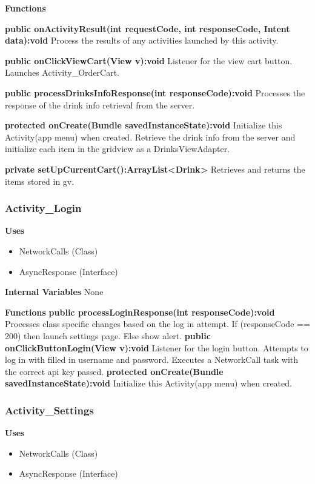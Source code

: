 \documentclass [10pt]{article}
\begin{document}
\textbf{Functions}

\textbf{public onActivityResult(int requestCode, int responseCode, Intent data):void}
Process the results of any activities launched by this activity.

\textbf{public onClickViewCart(View v):void}
Listener for the view cart button. Launches Activity\_OrderCart.

\textbf{public processDrinksInfoResponse(int responseCode):void}
Processes the response of the drink info retrieval from the server.

\textbf{protected onCreate(Bundle savedInstanceState):void}
Initialize this Activity(app menu) when created. Retrieve the drink info from the server and initialize each item in the gridview as a DrinksViewAdapter. 

\textbf{private setUpCurrentCart():ArrayList<Drink>}
Retrieves and returns the items stored in gv.

\subsubsection{Activity\_Login}

\textbf{Uses}

\begin{itemize}
	\item NetworkCalls (Class)
	\item AsyncResponse (Interface)
\end{itemize}

\textbf{Internal Variables} None

\textbf{Functions}
\textbf{public processLoginResponse(int responseCode):void}
Processes class specific changes based on the log in attempt. If (responseCode == 200) then launch settings page. Else show alert.
\textbf{public onClickButtonLogin(View v):void}
Listener for the login button. Attempts to log in with filled in username and password. Executes a NetworkCall task with the correct api key passed.
\textbf{protected onCreate(Bundle savedInstanceState):void}
Initialize this Activity(app menu) when created.

\subsubsection{Activity\_Settings}

\textbf{Uses}
\begin{itemize}
	\item NetworkCalls (Class)
	\item AsyncResponse (Interface)
\end{itemize}
\end{document}
